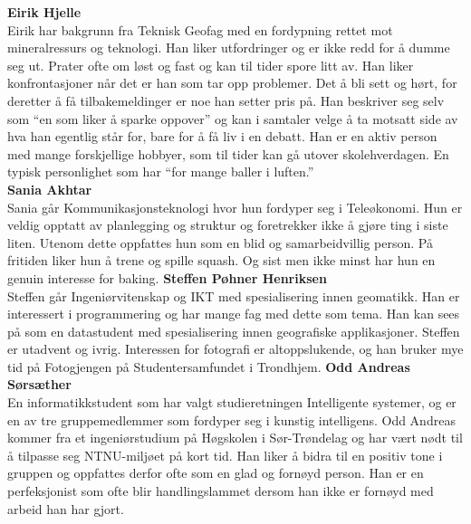 \documentclass[a4paper,norsk,oneside]{article}
\begin{document}
\textbf{Eirik Hjelle}\\
Eirik har bakgrunn fra Teknisk Geofag med en fordypning rettet mot mineralressurs og teknologi. Han liker utfordringer og er ikke redd for å dumme seg ut. Prater ofte om løst og fast og kan til tider spore litt av. Han liker konfrontasjoner når det er han som tar opp problemer. Det å bli sett og hørt, for deretter å få tilbakemeldinger er noe han setter pris på. Han beskriver seg selv som “en som liker å sparke oppover” og kan i samtaler velge å ta motsatt side av hva han egentlig står for, bare for å få liv i en debatt. Han er en aktiv person med mange forskjellige hobbyer, som til tider kan gå utover skolehverdagen. En typisk personlighet som har “for mange baller i luften.”   \\
\newline
\newline
\textbf{Sania Akhtar}\\
Sania går Kommunikasjonsteknologi hvor hun fordyper seg i Teleøkonomi. Hun er veldig opptatt av planlegging og struktur og foretrekker ikke å gjøre ting i siste liten. Utenom dette oppfattes hun som en blid og samarbeidvillig person. På fritiden liker hun å trene og spille squash. Og sist men ikke minst har hun en genuin interesse for baking. 	
\newline
\newline
\textbf{Steffen Pøhner Henriksen}\\
Steffen går Ingeniørvitenskap og IKT med spesialisering innen geomatikk. Han er interessert i programmering og har mange fag med dette som tema. Han kan sees på som en datastudent med spesialisering innen geografiske applikasjoner. Steffen er utadvent og ivrig. Interessen for fotografi er altoppslukende, og han bruker mye tid på Fotogjengen på Studentersamfundet i Trondhjem.
\newline
\newline
\textbf{Odd Andreas Sørsæther}\\
En informatikkstudent som har valgt studieretningen Intelligente systemer, og er en av tre gruppemedlemmer som fordyper seg i kunstig intelligens. Odd Andreas kommer fra et ingeniørstudium på Høgskolen i Sør-Trøndelag og har vært nødt til å tilpasse seg NTNU-miljøet på kort tid. Han liker å bidra til en positiv tone i gruppen og oppfattes derfor ofte som en glad og fornøyd person. Han er en perfeksjonist som ofte blir handlingslammet dersom han ikke er fornøyd med arbeid han har gjort.
\newline
\newline
\end{document}
